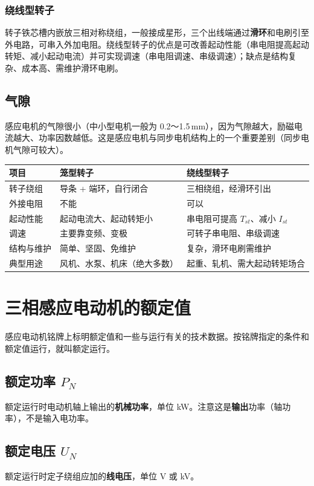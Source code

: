\subsubsection{绕线型转子}
转子铁芯槽内嵌放三相对称绕组，一般接成星形，三个出线端通过\textbf{滑环}和电刷引至外电路，可串入外加电阻。绕线型转子的优点是可改善起动性能（串电阻提高起动转矩、减小起动电流）并可实现调速（串电阻调速、串级调速）；缺点是结构复杂、成本高、需维护滑环电刷。

\subsection{气隙}
感应电机的气隙很小（中小型电机一般为 0.2～1.5\,mm），因为气隙越大，励磁电流越大、功率因数越低。这是感应电机与同步电机结构上的一个重要差别（同步电机气隙可较大）。

\begin{center}
\begin{tabular}{@{}p{2.4cm}p{4.6cm}p{4.6cm}@{}}
\toprule
项目 & 笼型转子 & 绕线型转子 \\
\midrule
转子绕组 & 导条 + 端环，自行闭合 & 三相绕组，经滑环引出 \\
外接电阻 & 不能 & 可以 \\
起动性能 & 起动电流大、起动转矩小 & 串电阻可提高 $T_{st}$、减小 $I_{st}$ \\
调速 & 主要靠变频、变极 & 可转子串电阻、串级调速 \\
结构与维护 & 简单、坚固、免维护 & 复杂，滑环电刷需维护 \\
典型用途 & 风机、水泵、机床（绝大多数） & 起重、轧机、需大起动转矩场合 \\
\bottomrule
\end{tabular}
\end{center}

\section{三相感应电动机的额定值}

感应电动机铭牌上标明额定值和一些与运行有关的技术数据。按铭牌指定的条件和额定值运行，就叫额定运行。

\subsection{额定功率 $P_N$}
额定运行时电动机轴上输出的\textbf{机械功率}，单位 kW。注意这是\textbf{输出}功率（轴功率），不是输入电功率。

\subsection{额定电压 $U_N$}
额定运行时定子绕组应加的\textbf{线电压}，单位 V 或 kV。

